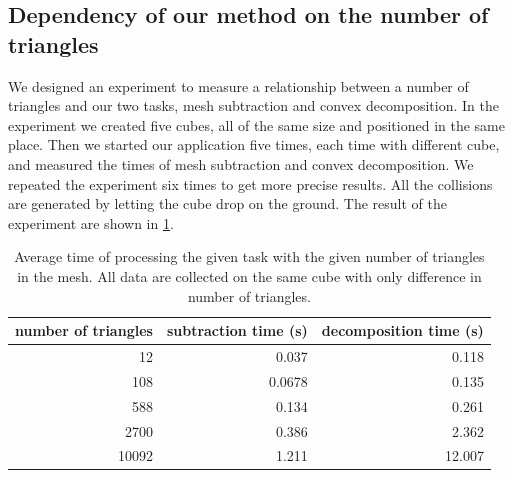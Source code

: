 \subsection{Dependency of our method on the number of triangles}
We designed an experiment to measure a relationship between a number of triangles and our two tasks, mesh subtraction and convex decomposition. In the experiment we created five cubes, all of the same size and positioned in the same place. Then we started our application five times, each time with different cube, and measured the times of mesh subtraction and convex decomposition. We repeated the experiment six times to get more precise results. All the collisions are generated by letting the cube drop on the ground. The result of the experiment are shown in \cref{tab:subtraction-decomposition}. 
\begin{table}
\centering
\begin{tabular}{r|r|r}
number of triangles & subtraction time (s) & decomposition time (s) \\
\hline
12 & 0.037 & 0.118 \\
108 & 0.0678 & 0.135 \\
588 & 0.134 & 0.261 \\ 
2700 & 0.386 & 2.362 \\ 
10092 & 1.211 & 12.007 \\
\end{tabular}
\caption{Average time of processing the given task with the given number of triangles in the mesh. All data are collected on the same cube with only difference in number of triangles.}
\label{tab:subtraction-decomposition}
\end{table}

